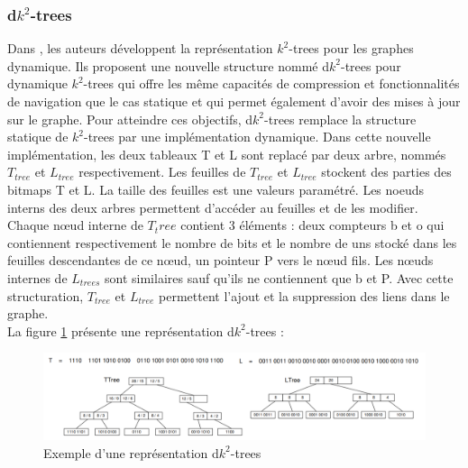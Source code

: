 \subsubsection{d$k^2$-trees}
Dans \citep{brisaboa2012compressed}, les auteurs développent la représentation $k^2$-trees pour les graphes dynamique. Ils proposent une nouvelle structure nommé d$k^2$-trees pour dynamique $k^2$-trees qui offre les même capacités de compression et fonctionnalités de navigation que le cas statique et qui permet également d'avoir des mises à jour sur le graphe. Pour atteindre ces objectifs, d$k^2$-trees remplace la structure statique de $k^2$-trees par une implémentation dynamique. Dans cette nouvelle implémentation, les deux tableaux T et L sont replacé par deux arbre, nommés $T_{tree}$ et $L_{tree}$ respectivement. Les feuilles de $T_{tree}$ et $L_{tree}$ stockent des parties des bitmaps T et L. La taille des feuilles est une valeurs paramétré. Les noeuds interns des deux arbres permettent d'accéder au feuilles et  de les modifier.\\
Chaque nœud interne de $T_tree$ contient 3 éléments : deux compteurs b et o qui contiennent respectivement le nombre de bits et le nombre de uns stocké dans les feuilles descendantes de ce nœud, un pointeur P vers le nœud fils. Les nœuds internes de $L_{trees}$ sont similaires sauf qu'ils ne contiennent que b et P. Avec cette structuration, $T_{tree}$ et $L_{tree}$ permettent l'ajout et la suppression des liens dans le graphe.\\
La figure \ref{dk2-trees} présente une représentation d$k^2$-trees \citep{brisaboa2012compressed}: 
\begin{figure}[H]
\begin{center}
\includegraphics[height=100 pt, width=380 pt]{./ressources/image/dk2-trees.png} 
\end{center}
\caption{Exemple d'une représentation d$k^2$-trees}
\label{dk2-trees}
\end{figure}

